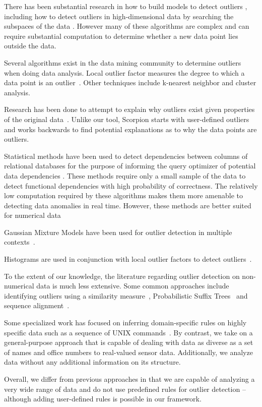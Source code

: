 
There has been substantial research in how to build models to detect outliers \cite{Aggarwal2013}, including how to detect outliers in high-dimensional data by searching the subspaces of the data \cite{Zhang2004}\cite{Kriegel2009}.
However many of these algorithms are complex and can require substantial computation to determine whether a new data point lies outside the data.

Several algorithms exist in the data mining community to determine outliers when doing data analysis.
Local outlier factor measures the degree to which a data point is an outlier~\cite{Breunig2000}.
Other techniques include k-nearest neighbor and cluster analysis.

Research has been done to attempt to explain why outliers exist given properties of the original data~\cite{Wu}. Unlike our tool, Scorpion starts with user-defined outliers and works backwards to find potential explanations as to why the data points are outliers.

Statistical methods have been used to detect dependencies between columns of relational databases for the purpose of informing the query optimizer of potential data dependencies \cite{Ilyas2004}. These methods require only a small sample of the data to detect functional dependencies with high probability of correctness. The relatively low computation required by these algorithms makes them more amenable to detecting data anomalies in real time. However, these methods are better suited for numerical data~\cite{Hodge2004}

Gaussian Mixture Models have been used for outlier detection in multiple contexts~\cite{Lu2005,Roberts1994,Roberts1999}.

Histograms are used in conjunction with local outlier factors to detect outliers~\cite{Gebski2007}.

To the extent of our knowledge, the literature regarding outlier detection on non-numerical data is much less extensive. Some common approaches include identifying outliers using a similarity measure~\cite{Budalakoti2006}, Probabilistic Suffix Trees~\cite{Sun2006} and sequence alignment~\cite{Bouarfa2012}.

Some specialized work has focused on inferring domain-specific rules on highly specific data such as a sequence of UNIX commands~\cite{Lane1997a,Lane1997b}. By contrast, we take on a general-purpose approach that is capable of dealing with data as diverse as a set of names and office numbers to real-valued sensor data. Additionally, we analyze data without any additional information on its structure.

Overall, we differ from previous approaches in that we are capable of analyzing a very wide range of data and do not use predefined rules for outlier detection -- although adding user-defined rules is possible in our framework.
